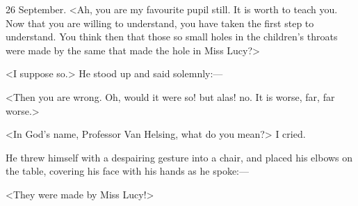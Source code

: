 \begin{diary}{26 September.}
<Ah, you are my favourite pupil still. It is worth to teach you. Now that you are willing to understand, you have taken the first step to understand. You think then that those so small holes in the children's throats were made by the same that made the hole in Miss Lucy?>

<I suppose so.> He stood up and said solemnly:—

<Then you are wrong. Oh, would it were so! but alas! no. It is worse, far, far worse.>

<In God's name, Professor Van Helsing, what do you mean?> I cried.

He threw himself with a despairing gesture into a chair, and placed his elbows on the table, covering his face with his hands as he spoke:—

<They were made by Miss Lucy!>
\end{diary}

